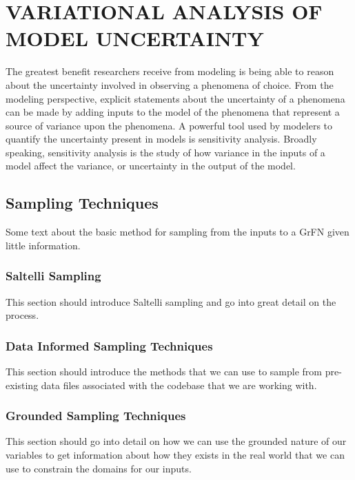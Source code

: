 \chapter{VARIATIONAL ANALYSIS OF MODEL UNCERTAINTY\label{chapter:analysis}}

The greatest benefit researchers receive from modeling is being able to reason about the uncertainty involved in observing a phenomena of choice. From the modeling perspective, explicit statements about the uncertainty of a phenomena can be made by adding inputs to the model of the phenomena that represent a source of variance upon the phenomena. A powerful tool used by modelers to quantify the uncertainty present in models is sensitivity analysis. Broadly speaking, sensitivity analysis is the study of how variance in the inputs of a model affect the variance, or uncertainty in the output of the model.

\section{Sampling Techniques\label{sec:samp_overview}}

Some text about the basic method for sampling from the inputs to a GrFN given little information.

\subsection{Saltelli Sampling\label{sec:saltelli_samp}}

This section should introduce Saltelli sampling and go into great detail on the process.

\subsection{Data Informed Sampling Techniques\label{sec:data_samp}}

This section should introduce the methods that we can use to sample from pre-existing data files associated with the codebase that we are working with.

\subsection{Grounded Sampling Techniques\label{sec:grounded_samp}}

This section should go into detail on how we can use the grounded nature of our variables to get information about how they exists in the real world that we can use to constrain the domains for our inputs.

